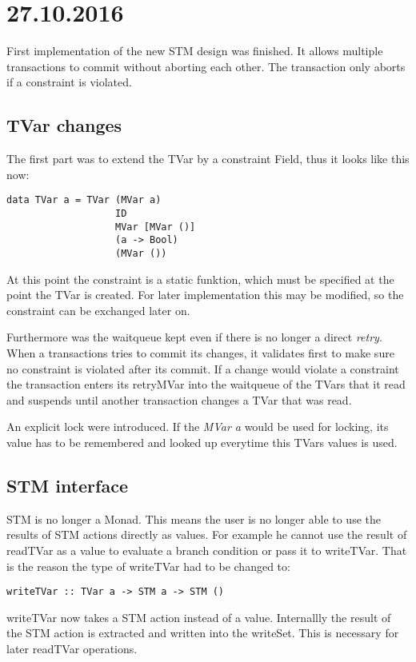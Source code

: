 \documentclass[a4paper,10pt]{article}
\title{}
\author{}
\date{}
\begin{document}
\maketitle
\section{27.10.2016}
First implementation of the new STM design was finished. It allows multiple transactions to commit without aborting each other.
The transaction only aborts if a constraint is violated.
\subsection{TVar changes}
The first part was to extend the TVar by a constraint Field, thus it looks like this now:
\begin{lstlisting}
data TVar a = TVar (MVar a)
                   ID
                   MVar [MVar ()]
                   (a -> Bool)
                   (MVar ())
\end{lstlisting}
At this point the constraint is a static funktion, which must be specified at the point the 
TVar is created. For later implementation this may be modified, so the constraint can be exchanged 
later on. 

Furthermore was the waitqueue kept even if there is no longer a direct \textit{retry}.
When a transactions tries to commit its changes, it validates first to make sure no constraint is
violated after its commit. If a change would violate a constraint the transaction enters its retryMVar
into the waitqueue of the TVars that it read and suspends until another transaction changes a TVar that was read.

An explicit lock were introduced. If the \textit{MVar a} would be used for locking, its value has to be remembered
and looked up everytime this TVars values is used. 

\subsection{STM interface}
\label{stmint}
STM is no longer a Monad. This means the user is no longer able to use the results of STM actions directly as values.
For example he cannot use the result of readTVar as a value to evaluate a branch condition or pass it to writeTVar.
That is the reason the type of writeTVar had to be changed to:
\begin{lstlisting}
writeTVar :: TVar a -> STM a -> STM ()
\end{lstlisting}
writeTVar now takes a STM action instead of a value. Internallly the result of the STM action is extracted and written 
into the writeSet. This is necessary for later readTVar operations.
\end{document}
